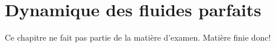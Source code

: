 \chapter{Dynamique des fluides parfaits}
Ce chapitre ne fait pas partie de la matière d'examen. Matière finie donc!